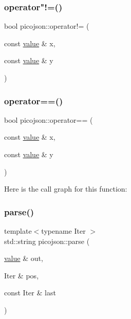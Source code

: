 \hypertarget{namespacepicojson_ae46de1e9659b427ea359e7fc00dd3ff1}{}\label{namespacepicojson_ae46de1e9659b427ea359e7fc00dd3ff1} 
\subsubsection{\texorpdfstring{operator"!=()}{operator!=()}}
{\footnotesize\ttfamily bool picojson\+::operator!= (\begin{DoxyParamCaption}\item[{const \hyperlink{classpicojson_1_1value}{value} \&}]{x,  }\item[{const \hyperlink{classpicojson_1_1value}{value} \&}]{y }\end{DoxyParamCaption})\hspace{0.3cm}{\ttfamily [inline]}}

\hypertarget{namespacepicojson_a498fde71ce35268547d93068d9a756be}{}\label{namespacepicojson_a498fde71ce35268547d93068d9a756be} 
\subsubsection{\texorpdfstring{operator==()}{operator==()}}
{\footnotesize\ttfamily bool picojson\+::operator== (\begin{DoxyParamCaption}\item[{const \hyperlink{classpicojson_1_1value}{value} \&}]{x,  }\item[{const \hyperlink{classpicojson_1_1value}{value} \&}]{y }\end{DoxyParamCaption})\hspace{0.3cm}{\ttfamily [inline]}}

Here is the call graph for this function\+:
\hypertarget{namespacepicojson_a3aca598f5855bc130a92a3e08a0c6ebf}{}\label{namespacepicojson_a3aca598f5855bc130a92a3e08a0c6ebf} 
\subsubsection{\texorpdfstring{parse()}{parse()}\hspace{0.1cm}{\footnotesize\ttfamily [1/4]}}
{\footnotesize\ttfamily template$<$typename Iter $>$ \\
std\+::string picojson\+::parse (\begin{DoxyParamCaption}\item[{\hyperlink{classpicojson_1_1value}{value} \&}]{out,  }\item[{Iter \&}]{pos,  }\item[{const Iter \&}]{last }\end{DoxyParamCaption})\hspace{0.3cm}{\ttfamily [inline]}}

